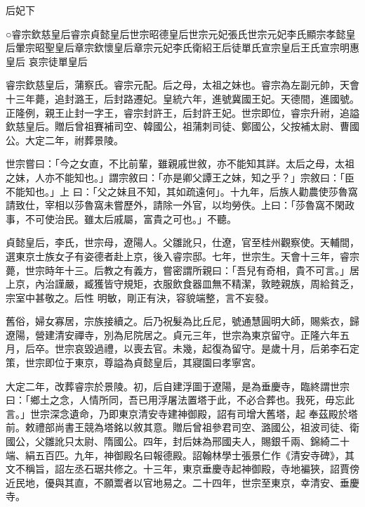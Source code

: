 
\begin{pinyinscope}

 后妃下



 ○睿宗欽慈皇后睿宗貞懿皇后世宗昭德皇后世宗元妃張氏世宗元妃李氏顯宗孝懿皇后暈宗昭聖皇后章宗欽懷皇后章宗元妃李氏衛紹王后徒單氏宣宗皇后王氏宣宗明惠皇后
 哀宗徒單皇后



 睿宗欽慈皇后，蒲察氏。睿宗元配。后之母，太祖之妹也。睿宗為左副元帥，天會十三年薨，追封潞王，后封路遷妃。皇統六年，進號冀國王妃。天德間，進國號。正隆例，親王止封一字王，睿宗封許王，后封許王妃。世宗即位，睿宗升祔，追謚欽慈皇后。贈后曾祖賽補司空、韓國公，祖蒲刺司徒、鄭國公，父按補太尉、曹國公。大定二年，祔葬景陵。



 世宗嘗曰：「今之女直，不比前輩，雖親戚世敘，亦不能知其詳。太后之母，太祖之妹，人亦不能知也。」謂宗敘曰：「亦是卿父譚王之妹，知之乎？」宗敘曰：「臣不能知也。」上
 曰：「父之妹且不知，其如疏遠何」。十九年，后族人勸農使莎魯窩請致仕，宰相以莎魯窩未嘗歷外，請除一外官，以均勞佚。上曰：「莎魯窩不閑政事，不可使治民。雖太后戚屬，富貴之可也。」不聽。



 貞懿皇后，李氏，世宗母，遼陽人。父雛訛只，仕遼，官至桂州觀察使。天輔間，選東京士族女子有姿德者赴上京，後入睿宗邸。七年，世宗生。天會十三年，睿宗薨，世宗時年十三。后教之有義方，嘗密謂所親曰：「吾兒有奇相，貴不可言。」居上京，內治謹嚴，臧獲皆守規矩，衣服飲食器皿無不精潔，敦睦親族，周給貧乏，宗室中甚敬之。后性
 明敏，剛正有決，容貌端整，言不妄發。



 舊俗，婦女寡居，宗族接續之。后乃祝髮為比丘尼，號通慧圓明大師，賜紫衣，歸遼陽，營建清安禪寺，別為尼院居之。貞元三年，世宗為東京留守。正隆六年五月，后卒。世宗哀毀過禮，以喪去官。未幾，起復為留守。是歲十月，后弟李石定策，世宗即位于東京，尊謚為貞懿皇后，其寢園曰孝寧宮。



 大定二年，改葬睿宗於景陵。初，后自建浮圖于遼陽，是為垂慶寺，臨終謂世宗曰：「鄉土之念，人情所同，吾已用浮屠法置塔于此，不必合葬也。我死，毋忘此言。」世宗深念遺命，乃即東京清安寺建神御殿，詔有司增大舊塔，起
 奉茲殿於塔前。敕禮部尚書王競為塔銘以敘其意。贈后曾祖參君司空、潞國公，祖波司徒、衛國公，父雛訛只太尉、隋國公。四年，封后妹為邢國夫人，賜銀千兩、錦綺二十端、絹五百匹。九年，神御殿名曰報德殿。詔翰林學士張景仁作《清安寺碑》，其文不稱旨，詔左丞石琚共修之。十三年，東京垂慶寺起神御殿，寺地褊狹，詔賈傍近民地，優與其直，不願鬻者以官地易之。二十四年，世宗至東京，幸清安、垂慶寺。




\end{pinyinscope}
